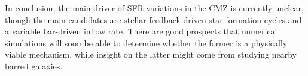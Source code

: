 In conclusion, the main driver of SFR variations in the CMZ is currently unclear, though the main candidates are stellar-feedback-driven star formation cycles and a variable bar-driven inflow rate. There are good prospects that numerical simulations will soon be able to determine whether the former is a physically viable mechanism, while insight on the latter might come from studying nearby barred galaxies.